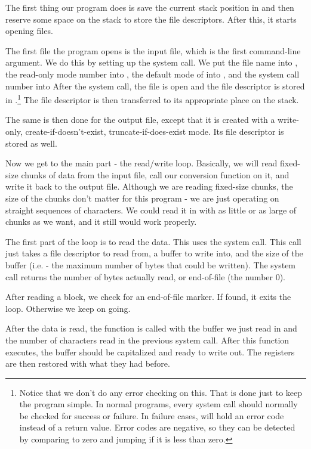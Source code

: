 The first thing our program does is save the current stack position
in {\ebpReg} and then reserve some space on the stack to store the file 
descriptors.  After this, it starts opening files.

The first file the program opens is the input file, which is the first 
command-line argument.  We do this by setting up the system call.
We put the file name into {\ebxRegIdx}, the read-only mode number
into {\ecxRegIdx}, the default mode of 
into {\edxRegIdx}, and the system call number into {\eaxRegIdx}
After the system call, the file is open and the file descriptor
is stored in  {\eaxRegIdx}.\footnote{Notice that we don't do any
error checking on this.  That is done just to keep the program simple.
In normal programs, every system call should normally be checked for
success or failure.  In failure cases, {\eaxReg} will hold an error
code instead of a return value.  Error codes are negative, so they
can be detected by comparing {\eaxRegIdx} to zero and jumping if it
is less than zero.}  The file
descriptor is then transferred to its appropriate place on the
stack.

The same is then done for the output file, except that it is 
created with a write-only, create-if-doesn't-exist, truncate-if-does-exist
mode.  Its file descriptor is stored as well.

Now we get to the main part - the read/write loop.  Basically, we
will read fixed-size chunks of data from the input file, call our
conversion function on it, and write it back to the output file.
Although we are reading fixed-size chunks, the size of the chunks
don't matter for this program - we are just operating on straight
sequences of characters.  We could read it in with as little or as large of
chunks as we want, and it still would work properly.

The first part of the loop is to read the data.  This uses the 
system call.  This call just takes a
file descriptor to read from, a buffer to write into, and the
size of the buffer
(i.e. - the maximum number of bytes that
could be written).  The system call returns the number of bytes
actually read, or end-of-file (the number 0).

After reading a block, we check {\eaxRegIdx} for an end-of-file marker.  
If found, it exits the loop.  Otherwise we keep on going.

After the data is read, the  function 
is called with the buffer we just read in and the number of characters 
read in the previous system call.  After this function executes,
the buffer should be capitalized and ready to write out.  The registers
are then restored with what they had before.

